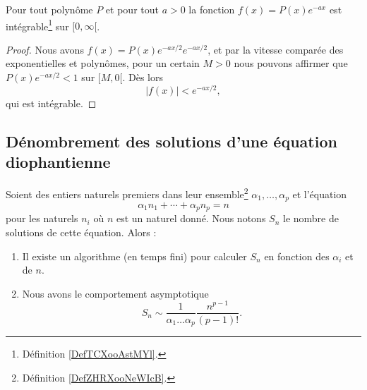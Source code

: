 \begin{proposition} \label{PropBQGBooHxNrrf}
    Pour tout polynôme \( P\) et pour tout \( a>0\) la fonction \( f(x)=P(x) e^{-ax}\) est intégrable\footnote{Définition \ref{DefTCXooAstMYl}.} sur \( \mathopen[ 0 , \infty [\).
\end{proposition}

\begin{proof}
    Nous avons \( f(x)=P(x) e^{-ax/2} e^{-ax/2}\), et par la vitesse comparée des exponentielles et polynômes, pour un certain \( M>0\) nous pouvons affirmer que \( P(x) e^{-ax/2}<1\) sur \( \mathopen[ M , 0 [\). Dès lors
        \begin{equation}
            | f(x) |< e^{-ax/2},
        \end{equation}
        qui est intégrable.
\end{proof}


\subsection{Dénombrement des solutions d'une équation diophantienne}

\begin{theorem} \label{ThoDIDNooUrFFei}
    Soient des entiers naturels premiers dans leur ensemble\footnote{Définition \ref{DefZHRXooNeWIcB}.} \( \alpha_1,\ldots, \alpha_p\) et l'équation
    \begin{equation}
        \alpha_1n_1+\cdots +\alpha_pn_p=n
    \end{equation}
    pour les naturels \( n_i\) où \( n\) est un naturel donné. Nous notons \( S_n\) le nombre de solutions de cette équation. Alors :
    \begin{enumerate}
        \item
            Il existe un algorithme (en temps fini) pour calculer \( S_n\) en fonction des \( \alpha_i\) et de \( n\).
        \item
            Nous avons le comportement asymptotique
            \begin{equation}
                S_n\sim\frac{1}{ \alpha_1\ldots\alpha_p }\frac{ n^{p-1} }{ (p-1)! }.
            \end{equation}
    \end{enumerate}
\end{theorem}

